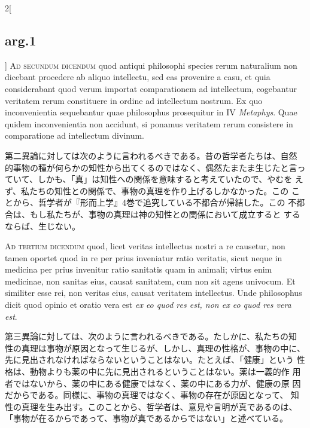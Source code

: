 \documentclass[paper=a4paper,fontsize=10pt,jafontsize=9pt,titlepage]{jlreq}
\begin{document}
\begin{paracol}{2}[\subsection{arg.1}]
{\scshape Ad secundum dicendum} quod antiqui philosophi species rerum
naturalium non dicebant procedere ab aliquo intellectu, sed eas
provenire a casu, et quia considerabant quod verum importat
comparationem ad intellectum, cogebantur veritatem rerum constituere
in ordine ad intellectum nostrum. Ex quo inconvenientia sequebantur
quae philosophus prosequitur in IV {\itshape Metaphys}. Quae quidem
inconvenientia non accidunt, si ponamus veritatem rerum consistere in
comparatione ad intellectum divinum.

\switchcolumn

第二異論に対しては次のように言われるべきである。昔の哲学者たちは、自然
的事物の種が何らかの知性から出てくるのではなく、偶然たまたま生じたと言っ
ていて、しかも、「真」は知性への関係を意味すると考えていたので、やむを
えず、私たちの知性との関係で、事物の真理を作り上げるしかなかった。この
ことから、哲学者が『形而上学』4巻で追究している不都合が帰結した。この
不都合は、もし私たちが、事物の真理は神の知性との関係において成立すると
するならば、生じない。

\switchcolumn*[\subsection{ad.3}]


{\scshape Ad tertium dicendum} quod, licet veritas intellectus nostri
a re causetur, non tamen oportet quod in re per prius inveniatur ratio
veritatis, sicut neque in medicina per prius invenitur ratio sanitatis
quam in animali; virtus enim medicinae, non sanitas eius, causat
sanitatem, cum non sit agens univocum. Et similiter esse rei, non
veritas eius, causat veritatem intellectus. Unde philosophus dicit
quod opinio et oratio vera est {\itshape ex eo quod res est, non ex eo
quod res vera est}.

\switchcolumn

第三異論に対しては、次のように言われるべきである。たしかに、私たちの知
性の真理は事物が原因となって生じるが、しかし、真理の性格が、事物の中に、
先に見出されなければならないということはない。たとえば、「健康」という
性格は、動物よりも薬の中に先に見出されるということはない。薬は一義的作
用者ではないから、薬の中にある健康ではなく、薬の中にある力が、健康の原
因だからである。同様に、事物の真理ではなく、事物の存在が原因となって、
知性の真理を生み出す。このことから、哲学者は、意見や言明が真であるのは、
「事物が在るからであって、事物が真であるからではない」と述べている。

\end{paracol}
\newpage
\end{document}

